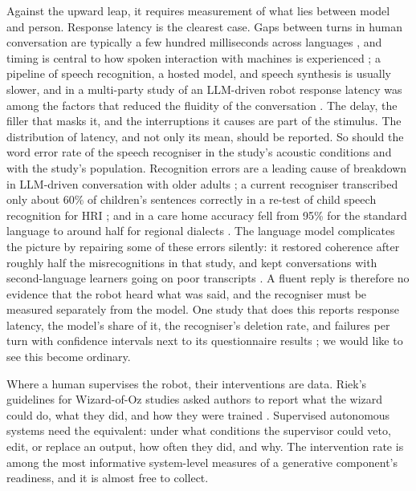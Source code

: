Against the upward leap, it requires measurement of what lies between model
and person. Response latency is the clearest case. Gaps between turns in
human conversation are typically a few hundred milliseconds across languages
\cite{stivers2009universals}, and timing is central to how spoken interaction
with machines is experienced \cite{skantze2021turn}; a pipeline of speech
recognition, a hosted model, and speech synthesis is usually slower, and in
a multi-party study of an LLM-driven robot response latency was among the
factors that reduced the fluidity of the conversation
\cite{abbo2026multi}. The delay, the filler that masks it, and the interruptions
it causes are part of the stimulus. The distribution of latency, and not only
its mean, should be reported. So should the word error rate of the speech
recogniser in the study's acoustic conditions and with the study's
population. Recognition errors are a leading cause of breakdown in
LLM-driven conversation with older adults
\cite{irfan2024recommendations,irfan2025between}; a current recogniser
transcribed only about 60\% of children's sentences correctly in a re-test
of child speech recognition for HRI \cite{janssens2025child}; and in a care
home accuracy fell from 95\% for the standard language to around half for
regional dialects \cite{pinto2025speech}. The language model complicates
the picture by repairing some of these errors silently: it restored
coherence after roughly half the misrecognitions in that study, and kept
conversations with second-language learners going on poor transcripts
\cite{verhelst2025large}. A fluent reply is therefore no evidence that the
robot heard what was said, and the recogniser must be measured separately
from the model. One study that does this reports response latency, the
model's share of it, the recogniser's deletion rate, and failures per turn
with confidence intervals next to its questionnaire results
\cite{satake2026focus}; we would like to see this become ordinary.

Where a human supervises the robot, their interventions are data. Riek's
guidelines for Wizard-of-Oz studies asked authors to report what the wizard
could do, what they did, and how they were trained \cite{riek2012wizard}.
Supervised autonomous systems need the equivalent: under what conditions the
supervisor could veto, edit, or replace an output, how often they did, and
why. The intervention rate is among the most informative system-level
measures of a generative component's readiness, and it is almost free to
collect.

